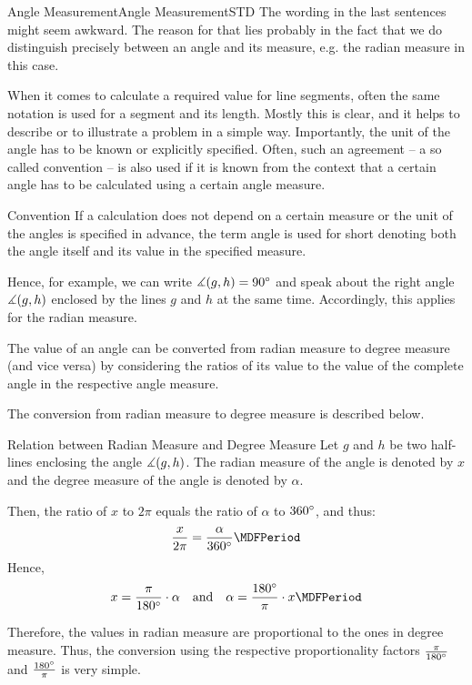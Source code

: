 \begin{MXContent}{Angle Measurement}{Angle Measurement}{STD}
The wording in the last sentences might seem awkward. The reason for that lies probably in the fact
that we do distinguish precisely between an angle and its measure, e.g. the radian measure in this case.

When it comes to calculate a required value for line segments, often the same notation is
used for a segment and its length. Mostly this is clear, and it helps to describe or to illustrate 
a problem in a simple way. Importantly, the unit of the angle has to be known or 
explicitly specified. Often, such an agreement -- a so called convention -- is also used if it is 
known from the context that a certain angle has to be calculated using a certain angle measure. 

\begin{MXInfo}{Convention}%
If a calculation does not depend on a certain measure or the unit of the angles
is specified in advance, the term angle is used for short denoting both the angle itself and its value in 
the specified measure.


\end{MXInfo}
Hence, for example, we can write $\measuredangle(g,h) = 90^{\circ}$ and speak about the 
right angle $\measuredangle(g,h)$ enclosed by the lines $g$ and $h$ at the same time.
Accordingly, this applies for the radian measure.

The value of an angle can be converted from radian measure to degree measure (and vice versa) by
considering the ratios of its value to the value of the complete angle in the 
respective angle measure. 

The conversion from radian measure to degree measure is described below.

\begin{MXInfo}{Relation between Radian Measure and Degree Measure}
Let $g$ and $h$ be two half-lines enclosing the angle $\measuredangle(g,h)$.
The radian measure of the angle is denoted by $x$ and the degree measure of 
the angle is denoted by $\alpha$.

Then, the ratio of $x$ to $2\pi$ equals the ratio of $\alpha$ to $360^{\circ}$, and thus:
\[
   \frac{x}{2\pi} = \frac{\alpha}{360\MGrad} \MDFPeriod
\]
Hence,
\[
x = \frac{\pi}{180\MGrad} \cdot \alpha %
\quad\text{and}\quad
\alpha = \frac{180\MGrad}{\pi} \cdot x \MDFPeriod
\]
\end{MXInfo}

Therefore, the values in radian measure are proportional to the ones in degree measure.
Thus, the conversion using the respective proportionality factors $\frac{\pi}{180^{\circ}}$ and 
$\frac{180^{\circ}}{\pi}$ is very simple.



\end{MXContent}
